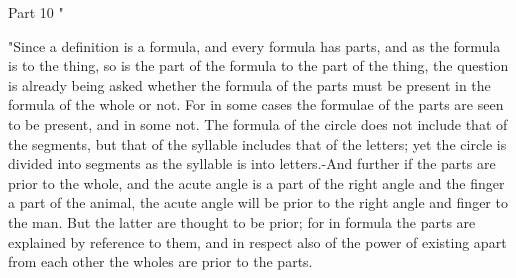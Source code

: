 Part 10 "

"Since a definition is a formula, and every formula has parts, and
as the formula is to the thing, so is the part of the formula to the
part of the thing, the question is already being asked whether the
formula of the parts must be present in the formula of the whole or
not. For in some cases the formulae of the parts are seen to be present,
and in some not. The formula of the circle does not include that of
the segments, but that of the syllable includes that of the letters;
yet the circle is divided into segments as the syllable is into letters.-And
further if the parts are prior to the whole, and the acute angle is
a part of the right angle and the finger a part of the animal, the
acute angle will be prior to the right angle and finger to the man.
But the latter are thought to be prior; for in formula the parts are
explained by reference to them, and in respect also of the power of
existing apart from each other the wholes are prior to the parts.

